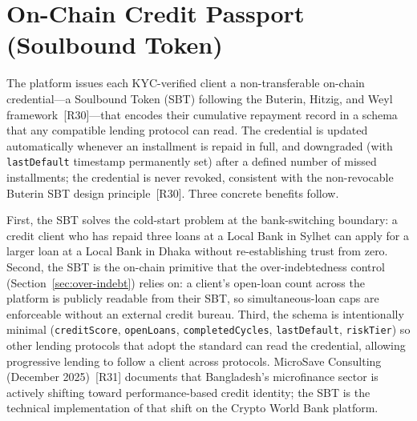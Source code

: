 \documentclass[12pt,a4paper]{report}
\begin{document}
\section{On-Chain Credit Passport (Soulbound Token)}
\label{sec:credit-passport}

The platform issues each KYC-verified client a non-transferable on-chain credential---a Soulbound Token (SBT) following the Buterin, Hitzig, and Weyl framework~[R30]---that encodes their cumulative repayment record in a schema that any compatible lending protocol can read. The credential is updated automatically whenever an installment is repaid in full, and downgraded (with \texttt{lastDefault} timestamp permanently set) after a defined number of missed installments; the credential is never revoked, consistent with the non-revocable Buterin SBT design principle~[R30]. Three concrete benefits follow.

First, the SBT solves the cold-start problem at the bank-switching boundary: a credit client who has repaid three loans at a Local Bank in Sylhet can apply for a larger loan at a Local Bank in Dhaka without re-establishing trust from zero. Second, the SBT is the on-chain primitive that the over-indebtedness control (Section~\ref{sec:over-indebt}) relies on: a client's open-loan count across the platform is publicly readable from their SBT, so simultaneous-loan caps are enforceable without an external credit bureau. Third, the schema is intentionally minimal (\texttt{creditScore}, \texttt{openLoans}, \texttt{completedCycles}, \texttt{lastDefault}, \texttt{riskTier}) so other lending protocols that adopt the standard can read the credential, allowing progressive lending to follow a client across protocols. MicroSave Consulting (December 2025)~[R31] documents that Bangladesh's microfinance sector is actively shifting toward performance-based credit identity; the SBT is the technical implementation of that shift on the Crypto World Bank platform.
\end{document}

